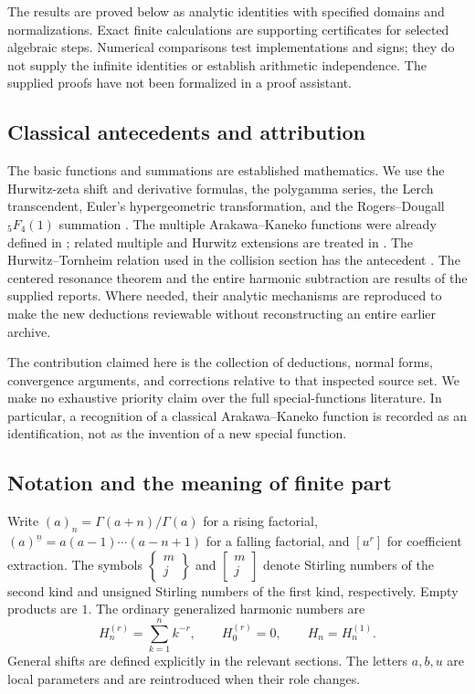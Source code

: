 The results are proved below as analytic identities with specified
domains and normalizations. Exact finite calculations are supporting
certificates for selected algebraic steps. Numerical comparisons
test implementations and signs; they do not supply the infinite
identities or establish arithmetic independence. The supplied proofs
have not been formalized in a proof assistant.

\subsection{Classical antecedents and attribution}

The basic functions and summations are established mathematics.
We use the Hurwitz-zeta shift and derivative formulas, the
polygamma series, the Lerch transcendent, Euler's hypergeometric
transformation, and the Rogers--Dougall ${}_5F_4(1)$ summation
\cite{DLMFHurwitz,DLMFPolygamma,DLMFLerch,DLMFHypergeom,DLMFDougall}.
The multiple Arakawa--Kaneko functions were already defined in
\cite{AK1999}; related multiple and Hurwitz extensions are treated
in \cite{KT2018,CC2010}. The Hurwitz--Tornheim relation used in the
collision section has the antecedent \cite{EspinosaMoll}.
The centered resonance theorem and the entire harmonic subtraction
are results of the supplied reports. Where needed, their analytic
mechanisms are reproduced to make the new deductions reviewable
without reconstructing an entire earlier archive.

The contribution claimed here is the collection of deductions,
normal forms, convergence arguments, and corrections relative to
that inspected source set. We make no exhaustive priority claim
over the full special-functions literature. In particular, a
recognition of a classical Arakawa--Kaneko function is recorded as
an identification, not as the invention of a new special function.

\subsection{Notation and the meaning of finite part}

Write $(a)_n=\Gamma(a+n)/\Gamma(a)$ for a rising factorial,
$(a)^{\underline n}=a(a-1)\cdots(a-n+1)$ for a falling factorial,
and $[u^r]$ for coefficient extraction. The symbols
$\left\{\begin{smallmatrix}m\\j\end{smallmatrix}\right\}$ and
$\left[\begin{smallmatrix}m\\j\end{smallmatrix}\right]$ denote
Stirling numbers of the second kind and unsigned Stirling numbers
of the first kind, respectively. Empty products are $1$.
The ordinary generalized harmonic numbers are
\[
 H_n^{(r)}=\sum_{k=1}^n k^{-r},\qquad H_0^{(r)}=0,
 \qquad H_n=H_n^{(1)}.
\]
General shifts are defined explicitly in the relevant sections.
The letters $a,b,u$ are local parameters and are reintroduced
when their role changes.

